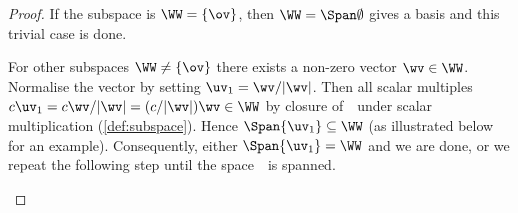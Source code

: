 \begin{proof} 
If the subspace is \(\WW=\{\ov\}\), then \(\WW=\Span\emptyset\) gives a basis and this trivial case is done.

For other subspaces \(\WW\neq\{\ov\}\) there exists a non-zero vector \(\wv\in\WW\).
Normalise the vector by setting \(\uv_1=\wv/|\wv|\).
Then all scalar multiples \(c\uv_1=c\wv/|\wv|=(c/|\wv|)\wv\in\WW\) by closure of~\WW\ under scalar multiplication (\autoref{def:subspace}). 
Hence \(\Span\{\uv_1\}\subseteq\WW\) (as illustrated below for an example).
Consequently, either  \(\Span\{\uv_1\}=\WW\) and we are done, or we repeat the following step until the space~\WW\ is spanned.
\begin{center}
\end{center}


\end{proof}
